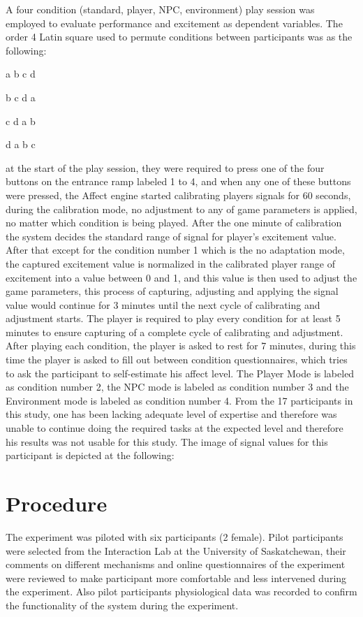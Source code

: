 \documentclass{uofsthesis-cs}
\begin{document}
A four condition (standard, player, NPC, environment) play session was employed to evaluate performance and excitement as dependent variables. The order 4 Latin square used to permute conditions between participants was as the following:

\centerline{a b c d}
\centerline{b c d a}
\centerline{c d a b}
\centerline{d a b c}

at the start of the play session, they were required to press one of the four buttons on the entrance ramp labeled 1 to 4, and when any one of these buttons were pressed, the Affect engine started calibrating players signals for 60 seconds, during the calibration mode, no adjustment to any of game parameters is applied, no matter which condition is being played. After the one minute of calibration the system decides the standard range of signal for player's excitement value. After that except for the condition number 1 which is the no adaptation mode, the captured excitement value is normalized in the calibrated player range of excitement into a value between 0 and 1, and this value is then used to adjust the game parameters, this process of capturing, adjusting and applying the signal value would continue for 3 minutes until the next cycle of calibrating and adjustment starts. The player is required to play every condition for at least 5 minutes to ensure capturing of a complete cycle of calibrating and adjustment. After playing each condition, the player is asked to rest for 7 minutes, during this time the player is asked to fill out between condition questionnaires, which tries to ask the participant to self-estimate his affect level. The Player Mode is labeled as condition number 2, the NPC mode is labeled as condition number 3 and the Environment mode is labeled as condition number 4. From the 17 participants in this study, one has been lacking adequate level of expertise and therefore was unable to continue doing the required tasks at the expected level and therefore his results was not usable for this study. The image of signal values for this participant is depicted at the following:

\section{Procedure}

The experiment was piloted with six participants (2 female). Pilot participants were selected from the Interaction Lab at the University of Saskatchewan, their comments on different mechanisms and online questionnaires of the experiment were reviewed to make participant more comfortable and less intervened during the experiment. Also pilot participants physiological data was recorded to confirm the functionality of the system during the experiment.
\end{document}
